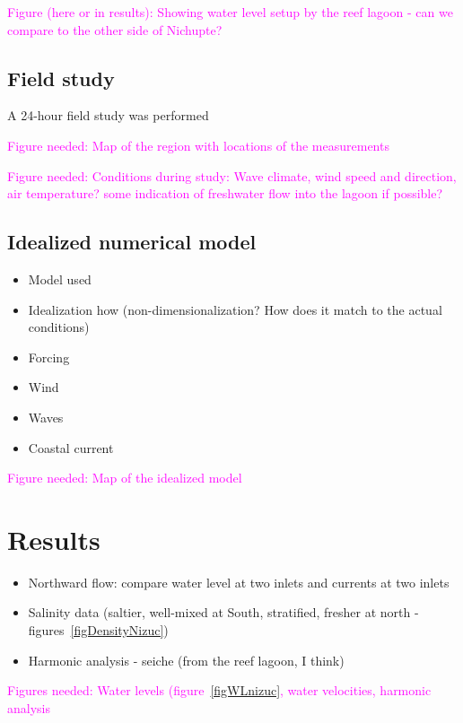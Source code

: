 \documentclass[11pt]{article}
\begin{document}
\textcolor{magenta}{Figure (here or in results): Showing water level setup by the reef lagoon - can we compare to the other side of Nichupte?}

\subsection{Field study}

A 24-hour field study was performed 

\textcolor{magenta}{Figure needed: Map of the region with locations of the measurements}

\textcolor{magenta}{Figure needed: Conditions during study: Wave climate, wind speed and direction, air temperature? some indication of freshwater flow into the lagoon if possible?}


\subsection{Idealized numerical model}

\begin{itemize}
	\item Model used
	\item Idealization how (non-dimensionalization? How does it match to the actual conditions)
	\item Forcing
		\item Wind
		\item Waves
		\item Coastal current
\end{itemize}

\textcolor{magenta}{Figure needed: Map of the idealized model}


\section{Results}

\begin{itemize}
	\item Northward flow: compare water level at two inlets and currents at two inlets
	\item Salinity data (saltier, well-mixed at South, stratified, fresher at north - figures~\ref{figDensityNizuc})
	\item Harmonic analysis - seiche (from the reef lagoon, I think)
\end{itemize}

\textcolor{magenta}{Figures needed: Water levels (figure~\ref{figWLnizuc}, water velocities, harmonic analysis}
\end{document}
